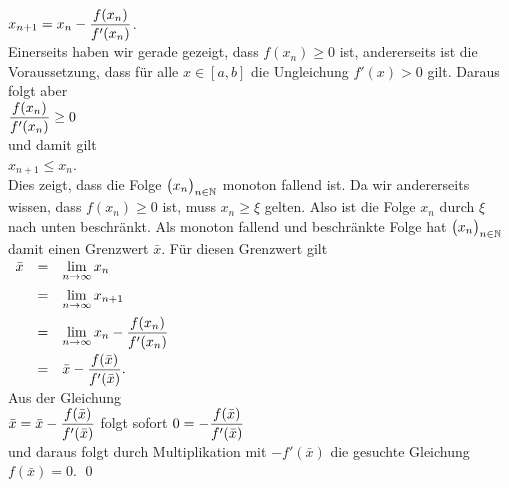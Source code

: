 \\[0.2cm]
\hspace*{1.3cm}
$\displaystyle x_{n+1} = x_n - \frac{f(x_n)}{f'(x_n)}$.
\\[0.2cm]
Einerseits haben wir gerade gezeigt, dass $f(x_n) \geq 0$ ist, andererseits ist die Voraussetzung, dass
f\"ur alle $x \in [a,b]$ die Ungleichung $f'(x) > 0$ gilt.  Daraus folgt aber
\\[0.2cm]
\hspace*{1.3cm}
$\displaystyle\frac{f(x_n)}{f'(x_n)} \geq 0$
\\[0.2cm]
und damit gilt
\\[0.2cm]
\hspace*{1.3cm}
$x_{n+1} \leq x_n$.
\\[0.2cm]
Dies zeigt, dass die Folge $\bigl(x_n\bigr)_{n\in\mathbb{N}}$ monoton fallend ist.  Da wir andererseits wissen, dass
$f(x_n) \geq 0$ ist, muss $x_n \geq \xi$ gelten.  Also ist die Folge $x_n$ durch $\xi$ nach unten beschr\"ankt.
Als monoton fallend und beschr\"ankte Folge hat $\bigl(x_n\bigr)_{n\in\mathbb{N}}$ damit einen Grenzwert $\bar{x}$.  
F\"ur diesen Grenzwert gilt 
\\[0.2cm]
\hspace*{1.3cm}
$
\begin{array}{lcl}
  \bar{x} & = & \displaystyle\lim\limits_{n\rightarrow\infty} x_n                             \\[0.3cm]
          & = & \displaystyle\lim\limits_{n\rightarrow\infty} x_{n+1}                         \\[0.3cm]
          & = & \displaystyle\lim\limits_{n\rightarrow\infty} x_{n} - \frac{f(x_n)}{f'(x_n)} \\[0.3cm]
          & = & \displaystyle\bar{x} - \frac{f(\bar{x})}{f'(\bar{x})}. 
\end{array}
$
\\[0.2cm]
Aus der Gleichung
\\[0.2cm]
\hspace*{1.3cm}
$\displaystyle \bar{x} = \bar{x} - \frac{f(\bar{x})}{f'(\bar{x})}$ \quad folgt sofort \quad $\displaystyle 0 = - \frac{f(\bar{x})}{f'(\bar{x})}$
\\[0.2cm]
und daraus folgt durch Multiplikation mit $-f'(\bar{x})$ die gesuchte Gleichung $f(\bar{x}) = 0$.  \qed

